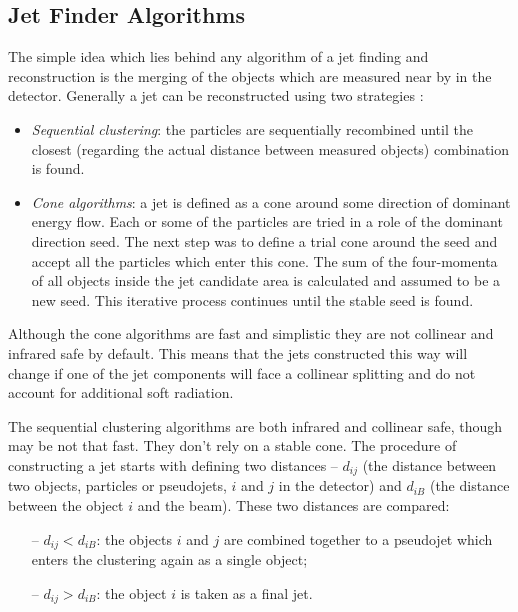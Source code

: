 \subsection{Jet Finder Algorithms}

The simple idea which lies behind any algorithm of a jet finding and reconstruction is the merging of the objects which are measured near by in the detector.
Generally a jet can be reconstructed using two strategies \cite{Salam:2007xv}:

\begin{itemize}
 \item \textit{Sequential clustering}: the particles are sequentially recombined until the closest (regarding the actual distance between measured
 objects) combination is found.
 \item \textit{Cone algorithms}: a jet is defined as a cone around some direction of dominant energy flow. Each or some of the particles are tried 
 in a role of the dominant direction seed. The next step was to define a trial cone around the seed and accept all the particles which enter this cone.
 The sum of the four-momenta of all objects inside the jet candidate area is calculated and assumed to be a new seed. This iterative process continues
 until the stable seed is found.
\end{itemize}

Although the cone algorithms are fast and simplistic they are not collinear and infrared safe by default. This means that the jets constructed this way will
change if one of the jet components will face a collinear splitting and do not account for additional soft radiation.

The sequential clustering algorithms are both infrared and collinear safe, though may be not that fast. They don't rely on a stable cone. The procedure of constructing
a jet starts with defining two distances -- $d_{ij}$ (the distance between two objects, particles or pseudojets, $i$ and $j$ in the detector) and $d_{iB}$ (the distance between the object $i$
and the beam). These two distances are compared:

\begin{itemize}
 \item [--] $d_{ij} < d_{iB}$: the objects $i$ and $j$ are combined together to a pseudojet which enters the clustering again as a single object;
 \item [--] $d_{ij} > d_{iB}$: the object $i$ is taken as a final jet.
\end{itemize}

